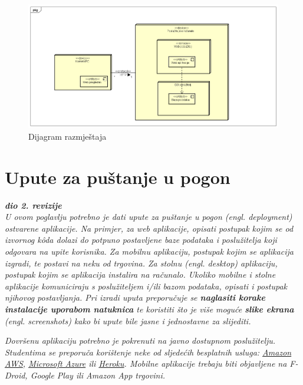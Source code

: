 			 \begin{figure}[H]
				\includegraphics[scale=0.5]{slike/dijagram_razmjestaja.png} %
				\centering
				\caption{Dijagram razmještaja}
				\label{fig:promjene}
			\end{figure}
			
			\eject 
		
		\section{Upute za puštanje u pogon}
		
			\textbf{\textit{dio 2. revizije}}\\
		
			 \textit{U ovom poglavlju potrebno je dati upute za puštanje u pogon (engl. deployment) ostvarene aplikacije. Na primjer, za web aplikacije, opisati postupak kojim se od izvornog kôda dolazi do potpuno postavljene baze podataka i poslužitelja koji odgovara na upite korisnika. Za mobilnu aplikaciju, postupak kojim se aplikacija izgradi, te postavi na neku od trgovina. Za stolnu (engl. desktop) aplikaciju, postupak kojim se aplikacija instalira na računalo. Ukoliko mobilne i stolne aplikacije komuniciraju s poslužiteljem i/ili bazom podataka, opisati i postupak njihovog postavljanja. Pri izradi uputa preporučuje se \textbf{naglasiti korake instalacije uporabom natuknica} te koristiti što je više moguće \textbf{slike ekrana} (engl. screenshots) kako bi upute bile jasne i jednostavne za slijediti.}
			
			
			 \textit{Dovršenu aplikaciju potrebno je pokrenuti na javno dostupnom poslužitelju. Studentima se preporuča korištenje neke od sljedećih besplatnih usluga: \href{https://aws.amazon.com/}{Amazon AWS}, \href{https://azure.microsoft.com/en-us/}{Microsoft Azure} ili \href{https://www.heroku.com/}{Heroku}. Mobilne aplikacije trebaju biti objavljene na F-Droid, Google Play ili Amazon App trgovini.}
			 
